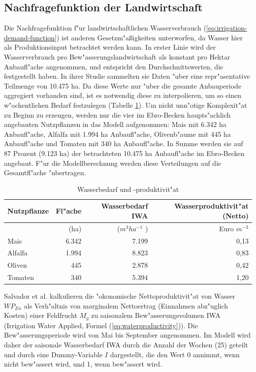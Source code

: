 \documentclass[11pt,a4paper]{article}
\begin{document}
\subsection{Nachfragefunktion der Landwirtschaft}\label{sec: Nachfrage-LL}
Die Nachfragefunktion f"ur landwirtschaftlichen Wasserverbrauch (\ref{eq:irrigation-demand-function}) ist anderen Gesetzm"aßigkeiten unterworfen, da Wasser hier als Produktionsinput betrachtet werden kann. In erster Linie wird der Wasserverbrauch pro Bew"asserungslandwirtschaft als konstant pro Hektar Anbaufl"ache angenommen, und entspricht den Durchschnittswerten, die \cite{Salvador2011} festgestellt haben. In ihrer Studie sammelten sie Daten "uber eine repr"asentative Teilmenge von 10.475 ha. Da diese Werte nur "uber die gesamte Anbauperiode aggregiert vorhanden sind, ist es notwendig diese zu interpolieren, um so einen w"ochentlichen Bedarf festzulegen (Tabelle \ref{tab:waterproductivity}). Um nicht unn"otige Komplexit"at zu Beginn zu erzeugen, werden nur die vier im Ebro-Becken haupts"achlich angebauten Nutzpflanzen in das Modell aufgenommen: Mais mit 6.342 ha Anbaufl"ache, Alfalfa mit 1.994 ha Anbaufl"ache, Olivenb"aume mit 445 ha Anbaufl"ache und Tomaten mit 340 ha Anbaufl"ache. In Summe werden sie auf 87 Prozent (9.123 ha) der betrachteten 10.475 ha Anbaufl"ache im Ebro-Becken angebaut. F"ur die Modellberechnung werden diese Verteilungen auf die Gesamtfl"ache "ubertragen.\\

\begin{table}[h]
\begin{tabular}{|l|r|r|r|}
\hline Nutzpflanze & Fl"ache & Wasserbedarf IWA & Wasserproduktivit"at (Netto) \\ 
\hline & (ha) & ($m^{3}ha^{-1}$ ) & Euro $m^{-3}$ \\
\hline Mais & 6.342 & 7.199 & 0,13 \\ 
\hline Alfalfa & 1.994 & 8.823 & 0,83 \\ 
\hline Oliven & 445 & 2.878 & 0,42 \\ 
\hline Tomaten & 340 & 5.394 & 1,20 \\ 
\hline 
\end{tabular} 
\caption{Wasserbedarf und -produktivit"at}
\label{tab:waterproductivity}
\end{table}

Salvador et al. kalkulieren die "okonomische Nettoproduktivit"at von Wasser $WP_{En}$ als Verh"altnis von marginalem Nettoertrag (Einnahmen abz"uglich Kosten) einer Feldfrucht $M_{g}$ zu saisonalem Bew"asserungsvolumen IWA (Irrigation Water Applied, Formel (\ref{eq:waterproductivity})). Die Bew"asserungsperiode wird von Mai bis September angenommen. Im Modell wird daher der saisonale Wasserbedarf IWA durch die Anzahl der Wochen (25) geteilt und durch eine Dummy-Variable $I$ dargestellt, die den Wert 0 annimmt, wenn nicht bew"assert wird, und 1, wenn bew"assert wird.\\
\end{document}
